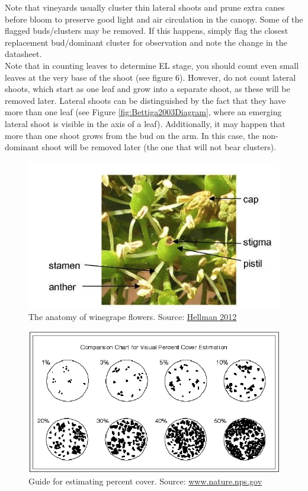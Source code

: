 \documentclass[11pt,letter]{article}
\begin{document}
\begin{enumerate}
Note that vineyards usually cluster thin lateral shoots and prune extra canes before bloom to preserve good light and air circulation in the canopy. Some of the flagged buds/clusters may be removed. If this happens, simply flag the closest replacement bud/dominant cluster for observation and note the change in the datasheet.\\

Note that in counting leaves to determine EL stage, you should count even small leaves at the very base of the shoot (see figure 6). However, do not count lateral shoots, which start as one leaf and grow into a separate shoot, as these will be removed later. Lateral shoots can be distinguished by the fact that they have more than one leaf (see Figure \ref{fig:Bettiga2003Diagram}, where an emerging lateral shoot is visible in the axis of a leaf). Additionally, it may happen that more than one shoot grows from the bud on the arm. In this case, the non-dominant shoot will be removed later (the one that will not bear clusters).\\

\begin{figure}
  \includegraphics[scale = 0.65]{flowerlabels}
  \caption{The anatomy of winegrape flowers. Source: \href{http://www.extension.org/pages/31097/parts-of-the-grape-vine:-flowers-and-fruit\#.U1f7TeaSy2K} {Hellman 2012} }
  \label{fig:labeledFlowers}
\end{figure}

\begin{figure}
  \includegraphics[width=\linewidth]{percentcover}
  \caption{Guide for estimating percent cover. Source: \url{www.nature.nps.gov} }
  \label{fig:percentCover}
\end{figure}


\end{enumerate}
\end{document}
